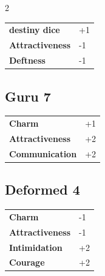 \begin{multicols}{2}
\begin{tcolorbox}
\begin{tabular}{@{}ll@{}}
    \textbf{destiny dice} & +1\\
    \textbf{Attractiveness} & -1\\
    \textbf{Deftness} & -1\\
\end{tabular}


\end{tcolorbox}

\begin{tcolorbox}
    \subsection*{Guru \hfill \small{7 }}
    \tcblower




\begin{tabular}{@{}ll@{}}
    \textbf{Charm} & +1\\
    \textbf{Attractiveness} & +2\\
    \textbf{Communication} & +2\\
\end{tabular}


\end{tcolorbox}

\begin{tcolorbox}
    \subsection*{Deformed \hfill \small{4 }}
    \tcblower




\begin{tabular}{@{}ll@{}}
    \textbf{Charm} & -1\\
    \textbf{Attractiveness} & -1\\
    \textbf{Intimidation} & +2\\
    \textbf{Courage} & +2\\
\end{tabular}



\end{tcolorbox}
\end{multicols}
